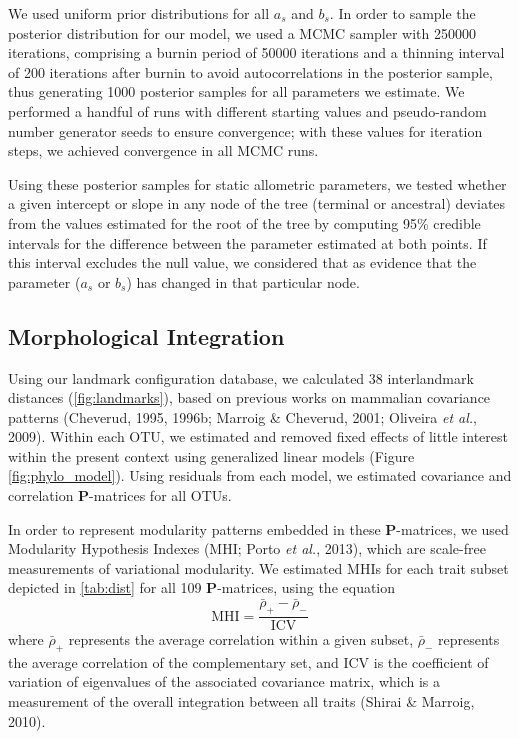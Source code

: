 \documentclass[12pt,twoside]{report}
\begin{document}
We used uniform prior distributions for all $a_s$ and $b_s$. In order to
sample the posterior distribution for our model, we used a MCMC sampler
with 250000 iterations, comprising a burnin period of 50000 iterations
and a thinning interval of 200 iterations after burnin to avoid
autocorrelations in the posterior sample, thus generating 1000 posterior
samples for all parameters we estimate. We performed a handful of runs
with different starting values and pseudo-random number generator seeds
to ensure convergence; with these values for iteration steps, we
achieved convergence in all MCMC runs.

Using these posterior samples for static allometric parameters, we
tested whether a given intercept or slope in any node of the tree
(terminal or ancestral) deviates from the values estimated for the root
of the tree by computing 95\% credible intervals for the difference
between the parameter estimated at both points. If this interval
excludes the null value, we considered that as evidence that the
parameter ($a_s$ or $b_s$) has changed in that particular node.

\subsection{Morphological Integration}\label{morphological-integration}

Using our landmark configuration database, we calculated 38
interlandmark distances (\autoref{fig:landmarks}), based on previous
works on mammalian covariance patterns (Cheverud, 1995, 1996b; Marroig
\& Cheverud, 2001; Oliveira \emph{et al.}, 2009). Within each OTU, we
estimated and removed fixed effects of little interest within the
present context using generalized linear models (Figure
\ref{fig:phylo_model}). Using residuals from each model, we estimated
covariance and correlation $\mathbf{P}$-matrices for all OTUs.

In order to represent modularity patterns embedded in these
$\mathbf{P}$-matrices, we used Modularity Hypothesis Indexes (MHI; Porto
\emph{et al.}, 2013), which are scale-free measurements of variational
modularity. We estimated MHIs for each trait subset depicted in
\autoref{tab:dist} for all 109 $\mathbf{P}$-matrices, using the equation
\[
\text{MHI} = \frac {\bar{\rho}_{+} - \bar{\rho}_{-}} {\text{ICV}}
\] where $\bar{\rho}_{+}$ represents the average correlation within a
given subset, $\bar{\rho}_{-}$ represents the average correlation of the
complementary set, and $\text{ICV}$ is the coefficient of variation of
eigenvalues of the associated covariance matrix, which is a measurement
of the overall integration between all traits (Shirai \& Marroig, 2010).
\end{document}
